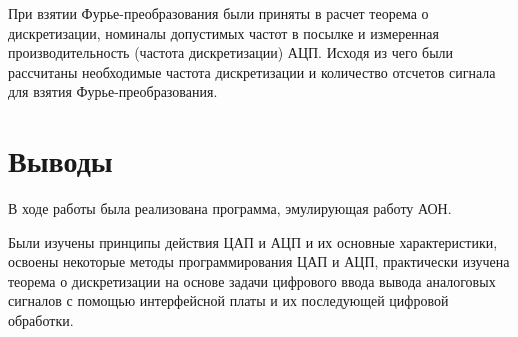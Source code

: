 При взятии Фурье-преобразования были приняты в расчет теорема о дискретизации, номиналы допустимых частот в посылке и измеренная производительность (частота дискретизации) АЦП. Исходя из чего были рассчитаны необходимые частота дискретизации и количество отсчетов сигнала для взятия Фурье-преобразования.

\section{Выводы}

В ходе работы была реализована программа, эмулирующая работу АОН.

Были изучены принципы действия ЦАП и АЦП и их основные характеристики, освоены некоторые методы программирования ЦАП и АЦП, практически изучена теорема о дискретизации на основе задачи цифрового ввода вывода аналоговых сигналов с помощью интерфейсной платы и их последующей цифровой обработки.